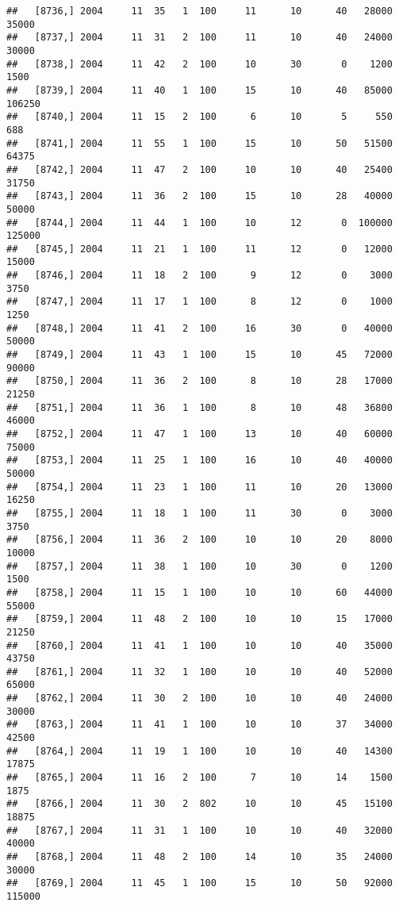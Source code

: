 \documentclass{article}\usepackage[]{graphicx}\usepackage[]{color}
\makeatletter
\newenvironment{kframe}{%
 \def\at@end@of@kframe{}%
 \ifinner\ifhmode%
  \def\at@end@of@kframe{\end{minipage}}%
  \begin{minipage}{\columnwidth}%
 \fi\fi%
 \def\FrameCommand##1{\hskip\@totalleftmargin \hskip-\fboxsep
 \colorbox{shadecolor}{##1}\hskip-\fboxsep
     \hskip-\linewidth \hskip-\@totalleftmargin \hskip\columnwidth}%
 \MakeFramed {\advance\hsize-\width
   \@totalleftmargin\z@ \linewidth\hsize
   \@setminipage}}%
 {\par\unskip\endMakeFramed%
 \at@end@of@kframe}
\newenvironment{knitrout}{}{} %
\makeatother
\begin{document}
\begin{knitrout}
\begin{kframe}
\begin{verbatim}
##   [8736,] 2004     11  35   1  100     11      10      40   28000   35000
##   [8737,] 2004     11  31   2  100     11      10      40   24000   30000
##   [8738,] 2004     11  42   2  100     10      30       0    1200    1500
##   [8739,] 2004     11  40   1  100     15      10      40   85000  106250
##   [8740,] 2004     11  15   2  100      6      10       5     550     688
##   [8741,] 2004     11  55   1  100     15      10      50   51500   64375
##   [8742,] 2004     11  47   2  100     10      10      40   25400   31750
##   [8743,] 2004     11  36   2  100     15      10      28   40000   50000
##   [8744,] 2004     11  44   1  100     10      12       0  100000  125000
##   [8745,] 2004     11  21   1  100     11      12       0   12000   15000
##   [8746,] 2004     11  18   2  100      9      12       0    3000    3750
##   [8747,] 2004     11  17   1  100      8      12       0    1000    1250
##   [8748,] 2004     11  41   2  100     16      30       0   40000   50000
##   [8749,] 2004     11  43   1  100     15      10      45   72000   90000
##   [8750,] 2004     11  36   2  100      8      10      28   17000   21250
##   [8751,] 2004     11  36   1  100      8      10      48   36800   46000
##   [8752,] 2004     11  47   1  100     13      10      40   60000   75000
##   [8753,] 2004     11  25   1  100     16      10      40   40000   50000
##   [8754,] 2004     11  23   1  100     11      10      20   13000   16250
##   [8755,] 2004     11  18   1  100     11      30       0    3000    3750
##   [8756,] 2004     11  36   2  100     10      10      20    8000   10000
##   [8757,] 2004     11  38   1  100     10      30       0    1200    1500
##   [8758,] 2004     11  15   1  100     10      10      60   44000   55000
##   [8759,] 2004     11  48   2  100     10      10      15   17000   21250
##   [8760,] 2004     11  41   1  100     10      10      40   35000   43750
##   [8761,] 2004     11  32   1  100     10      10      40   52000   65000
##   [8762,] 2004     11  30   2  100     10      10      40   24000   30000
##   [8763,] 2004     11  41   1  100     10      10      37   34000   42500
##   [8764,] 2004     11  19   1  100     10      10      40   14300   17875
##   [8765,] 2004     11  16   2  100      7      10      14    1500    1875
##   [8766,] 2004     11  30   2  802     10      10      45   15100   18875
##   [8767,] 2004     11  31   1  100     10      10      40   32000   40000
##   [8768,] 2004     11  48   2  100     14      10      35   24000   30000
##   [8769,] 2004     11  45   1  100     15      10      50   92000  115000

\end{verbatim}
\end{kframe}
\end{knitrout}
\end{document}
